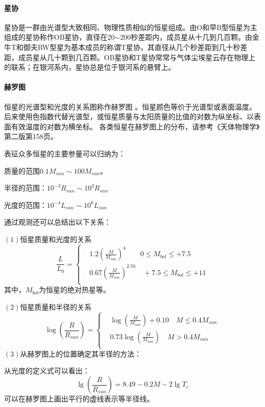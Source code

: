 \paragraph{星协}星协是一群由光谱型大致相同、物理性质相似的恒星组成。由O和早B型恒星为主组成的星协称作OB星协，直径在20$\sim$200秒差距内，成员星从十几到几百颗。由金牛T和御夫RW型星为基本成员的称谓T星协，其直径从几个秒差距到几十秒差距，成员星从几十颗到几百颗。OB星协和T星协常常与气体尘埃星云存在物理上的联系；在银河系内，星协总是位于银河系的悬臂上。
\paragraph{赫罗图}恒星的光谱型和光度的关系图称作赫罗图 。恒星颜色等价于光谱型或表面温度。后来使用色指数代替光谱型，或恒星质量与太阳质量的比值的对数为纵坐标、以表面有效温度的对数为横坐标。
各类恒星在赫罗图上的分布，请参考《天体物理学》第二版第158页。

表征众多恒星的主要参量可以归纳为：

质量的范围$0.1M_{sun}\sim 100M_{sun}$。

半径的范围：$10^{-3}R_{sun}\sim 10^{3}R_{sun}$

光度的范围：$10^{-4}L_{sun}\sim10^6L_{sun}$

通过观测还可以总结出以下关系：

$\left(1\right)$恒星质量和光度的关系
\begin{equation}
	\frac{L}{L_{0}}=\left\{
		\begin{aligned}
		&1.2\left(\frac{M}{M_{sun}}\right)^4 \qquad 0\leq M_{bol}\leq+7.5\\
		&0.67\left(\frac{M}{M_{sun}}\right)^{2.76} \quad +7.5\leq M_{bol}\leq+11\\
	\end{aligned}
	\right
	.
\end{equation}
其中，$M_{bol}$为恒星的绝对热星等。

$\left(2\right)$恒星质量和半径的关系
\begin{equation}
	\log\left(\frac{R}{R_{sun}}\right)=\left\{
		\begin{aligned}
			&\log\left(\frac{M}{M_{sun}}\right)+0.10 \quad M\leq 0.4M_{sun}\\
			&0.73\log\left(\frac{M}{M_{sun}}\right)\quad M >0.4M_{sun}\\
		\end{aligned}
	\right
	.
\end{equation}
$\left(3\right)$从赫罗图上的位置确定其半径的方法：

从光度的定义式可以看出：
\begin{equation}
	\lg \left(\frac{R}{R_{sun}}\right)=8.49-0.2M-2\lg T_{c}
\end{equation}
可以在赫罗图上画出平行的虚线表示等半径线。

